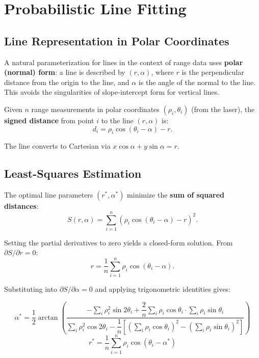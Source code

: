 \documentclass[11pt,a4paper]{article}
\theoremstyle{definition}
\theoremstyle{plain}
\theoremstyle{remark}
\begin{document}
\section{Probabilistic Line Fitting}

\subsection{Line Representation in Polar Coordinates}

A natural parameterization for lines in the context of range data uses \textbf{polar (normal) form}: a line is described by $(r, \alpha)$, where $r$ is the perpendicular distance from the origin to the line, and $\alpha$ is the angle of the normal to the line. This avoids the singularities of slope-intercept form for vertical lines.

Given $n$ range measurements in polar coordinates $(\rho_i, \theta_i)$ (from the laser), the \textbf{signed distance} from point $i$ to the line $(r, \alpha)$ is:
\[
d_i = \rho_i \cos(\theta_i - \alpha) - r.
\]

The line converts to Cartesian via $x\cos\alpha + y\sin\alpha = r$.

\subsection{Least-Squares Estimation}

The optimal line parameters $(r^*, \alpha^*)$ minimize the \textbf{sum of squared distances}:
\[
S(r, \alpha) = \sum_{i=1}^{n} \left(\rho_i \cos(\theta_i - \alpha) - r\right)^2.
\]

Setting the partial derivatives to zero yields a closed-form solution. From $\partial S/\partial r = 0$:
\[
r = \frac{1}{n}\sum_{i=1}^{n} \rho_i \cos(\theta_i - \alpha).
\]

Substituting into $\partial S / \partial \alpha = 0$ and applying trigonometric identities gives:

\begin{tcolorbox}[colback=blue!5!white,colframe=blue!75!black,title=\textbf{Closed-Form Line Fit (Polar Coordinates)}]
\[
\alpha^* = \frac{1}{2}\arctan\!\left(\frac{-\sum_i \rho_i^2 \sin 2\theta_i + \dfrac{2}{n}\sum_i \rho_i\cos\theta_i \cdot \sum_i \rho_i\sin\theta_i}{\sum_i \rho_i^2 \cos 2\theta_i - \dfrac{1}{n}\!\left[\left(\sum_i \rho_i\cos\theta_i\right)^2 - \left(\sum_i \rho_i\sin\theta_i\right)^2\right]}\right)
\]
\[
r^* = \frac{1}{n}\sum_{i=1}^{n} \rho_i \cos(\theta_i - \alpha^*)
\]
\end{tcolorbox}
\end{document}
